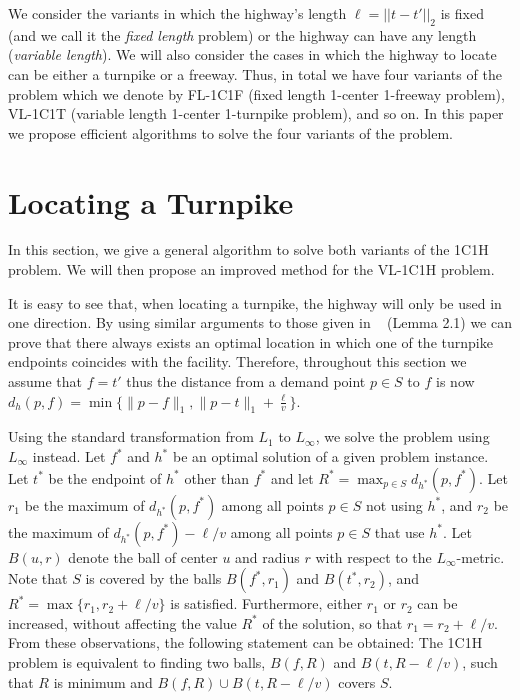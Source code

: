 \documentclass{llncs}
\newcommand{\ball}[1]{B({#1})}
\begin{document}
We consider the variants in which the highway's length $\ell=||t-t'||_2$ is fixed (and we call it the {\em fixed length} problem) or the highway can have any length ({\em variable length}). We will also consider the cases in which the highway to locate can be either a turnpike or a freeway. Thus,  in total we have four variants of the problem which we denote by FL-1C1F (fixed length 1-center 1-freeway problem), VL-1C1T (variable length 1-center 1-turnpike problem), and so on. In this paper we propose efficient algorithms to solve the four variants of the problem. 



\section{Locating a Turnpike}

In this section, we give a general algorithm to solve both variants of the 1C1H problem.
We will then propose an improved method for the VL-1C1H problem.

\medskip


It is easy to see that, when locating a turnpike, the highway will only be used in one direction.
By using similar arguments to those given in ~\cite{espejo11} (Lemma 2.1) we can prove that there always exists an optimal location in which one of the turnpike  endpoints coincides with the facility.
Therefore, throughout this section we assume that $f=t'$ thus the distance from a demand point $p\in S$ to $f$ is now $d_h(p,f)=\min\{\|p-f\|_1,\|p-t\|_1+\frac{\ell}{v}\}$.

\medskip
Using the standard transformation from $L_1$ to $L_{\infty}$, we solve the problem using $L_{\infty}$ instead.
Let $f^*$ and $h^*$ be an optimal solution of a given problem instance. Let $t^*$ be the endpoint of $h^*$ other than $f^*$ and let $R^*=\max_{p\in S}d_{h^*}(p,f^*)$.
Let $r_1$ be the maximum of $d_{h^*}(p,f^*)$ among all points $p\in S$ not using $h^*$,
and $r_2$ be the maximum of $d_{h^*}(p,f^*)-\ell/v$ among all points $p\in S$ that use $h^*$.
Let $\ball{u,r}$ denote the ball of center $u$ and radius $r$ with respect to the $L_{\infty}$-metric.
Note that $S$ is covered by the balls $\ball{f^*,r_1}$ and $\ball{t^*,r_2}$, and
$R^*=\max\{r_1,r_2+\ell/v\}$ is satisfied.
Furthermore, either $r_1$ or $r_2$ can be increased, without affecting the value $R^*$ of the solution, so that
$r_1=r_2+\ell/v$.
From these observations, the following
statement can be obtained: The 1C1H problem is equivalent to finding two balls, $\ball{f,R}$ and $\ball{t,R-\ell/v}$, such that $R$ is minimum and $\ball{f,R}\cup\ball{t,R-\ell/v}$ covers $S$.
\end{document}
